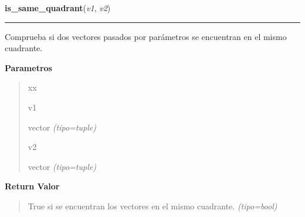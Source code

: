 \hspace{.8\funcindent}\begin{boxedminipage}{\funcwidth}

    \raggedright \textbf{is\_same\_quadrant}(\textit{v1}, \textit{v2})

    \vspace{-1.5ex}

    \rule{\textwidth}{0.5\fboxrule}
\setlength{\parskip}{2ex}
Comprueba si dos vectores pasados por parámetros se encuentran en el mismo cuadrante.

\setlength{\parskip}{1ex}
      \textbf{Parametros}
      \vspace{-1ex}

      \begin{quote}
        \begin{Ventry}{xx}

          \item[v1]


vector
            {\it (tipo=tuple)}

          \item[v2]


vector
            {\it (tipo=tuple)}

        \end{Ventry}

      \end{quote}

      \textbf{Return Valor}
    \vspace{-1ex}

      \begin{quote}

True si se encuentran los vectores en el mismo cuadrante.
      {\it (tipo=bool)}

      \end{quote}

    \end{boxedminipage}

    \label{src:check_goban_moved:degress_between_two_vectors}

    \vspace{0.5ex}

